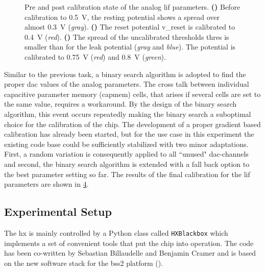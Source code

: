 \begin{figure}[htb!]
	\begin{subfigure}{0.32\textwidth}
		\caption{}
		\centering
		
		\label{hxprepostvleak}
	\end{subfigure}
	\begin{subfigure}{0.32\textwidth}
		\caption{}
		\centering
		
		\label{hxprepostvreset}
	\end{subfigure}
	\begin{subfigure}{0.32\textwidth}
		\caption{}
		\centering
		
		\label{hxprepostvthreshold}
	\end{subfigure}
	\caption[Pre and post calibration state of the analog \gls{lif} parameters.]{Pre and post calibration state of the analog \gls{lif} parameters. \textbf{()} Before calibration to \SI{0.5}{\V}, the resting potential shows a spread over almost \SI{0.3}{\V} (\textit{gray}). \textbf{()} The reset potential \gls{v_reset} is calibrated to \SI{0.4}{\V} (\textit{red}). \textbf{()} The spread of the uncalibrated thresholds \gls{thres} is smaller than for the leak potential (\textit{gray} and \textit{blue}). The potential is calibrated to \SI{0.75}{\V} (\textit{red}) and \SI{0.8}{\V} (\textit{green}).}
	\label{hxprepostcalib}
\end{figure}
Similar to the previous task, a binary search algorithm is adopted to find the proper \gls{dac} values of the analog parameters. The cross talk between individual capacitive parameter memory (capmem) cells, that arises if several cells are set to the same value, requires a workaround. By the design of the binary search algorithm, this event occurs repeatedly making the binary search a suboptimal choice for the calibration of the chip. The development of a proper gradient based calibration has already been started, but for the use case in this experiment the existing code base could be sufficiently stabilized with two minor adaptations. First, a random variation is consequently applied to all ``unused" \gls{dac}-channels and second, the binary search algorithm is extended with a fall back option to the best parameter setting so far. The results of the final calibration for the \gls{lif} parameters are shown in \cref{hxprepostcalib}.


\subsection{Experimental Setup}
The \gls{hx} is mainly controlled by a Python class called \texttt{HXBlackbox} which implements a set of convenient tools that put the chip into operation. The code has been co-written by Sebastian Billaudelle and Benjamin Cramer and is based on the new software stack for the \gls{bss2} platform (\citealp{mueller2020bss2ll}). 

